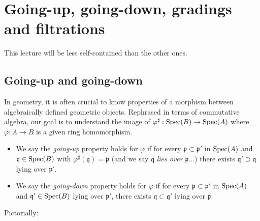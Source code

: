 
\chapter{Going-up, going-down, gradings and filtrations}

This lecture will be less self-contained than the other ones.

\section{Going-up and going-down}
In geometry, it is often crucial to know properties of a morphism between algebraically defined geometric objects. Rephrased in terms of commutative algebra, our goal is to understand the image of $\varphi^\sharp: \operatorname{Spec}(B) \to \operatorname{Spec}(A)$ where $\varphi: A \to B$ is a given ring homomorphism.

\begin{itemize}
	\item We say the \emph{going-up} property holds for $\varphi$ if for every $\mathfrak{p} \subset \mathfrak{p}'$ in $\operatorname{Spec}(A)$ and $\mathfrak{q} \in \operatorname{Spec}(B)$ with $\varphi^\sharp(\mathfrak{q}) = \mathfrak{p}$ (and we say $\mathfrak{q}$ \emph{lies over} $\mathfrak{p}$...) there exists $\mathfrak{q}' \supset \mathfrak{q}$ lying over $\mathfrak{p}'$. 
	\item We say the \emph{going-down} property holds for $\varphi$ if for every $\mathfrak{p} \subset \mathfrak{p}'$ in $\operatorname{Spec}(A)$ and $\mathfrak{q}' \in \operatorname{Spec}(B)$ lying over $\mathfrak{p}'$, there exists $\mathfrak{q} \subset \mathfrak{q}'$ lying over $\mathfrak{p}$. 
\end{itemize}
Pictorially:
\begin{center}\end{center}

